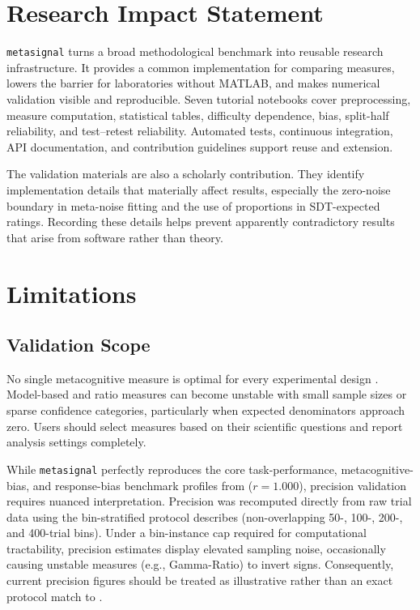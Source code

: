 \documentclass{article}
\begin{document}
\section{Research Impact Statement}\label{research-impact-statement}

\texttt{metasignal} turns a broad methodological benchmark into reusable research infrastructure. It provides a common implementation for comparing measures, lowers the barrier for laboratories without MATLAB, and makes numerical validation visible and reproducible. Seven tutorial notebooks cover preprocessing, measure computation, statistical tables, difficulty dependence, bias, split-half reliability, and test--retest reliability. Automated tests, continuous integration, API documentation, and contribution guidelines support reuse and extension.

The validation materials are also a scholarly contribution. They identify implementation details that materially affect results, especially the zero-noise boundary in meta-noise fitting and the use of proportions in SDT-expected ratings. Recording these details helps prevent apparently contradictory results that arise from software rather than theory.

\section{Limitations}\label{limitations}

\subsection{Validation Scope}\label{validation-scope}

No single metacognitive measure is optimal for every experimental design \citep{rahnev2025}. Model-based and ratio measures can become unstable with small sample sizes or sparse confidence categories, particularly when expected denominators approach zero. Users should select measures based on their scientific questions and report analysis settings completely.

While \texttt{metasignal} perfectly reproduces the core task-performance, metacognitive-bias, and response-bias benchmark profiles from \citet{rahnev2025} ($r = 1.000$), precision validation requires nuanced interpretation. Precision was recomputed directly from raw trial data using the bin-stratified protocol \citet{rahnev2025} describes (non-overlapping 50-, 100-, 200-, and 400-trial bins). Under a bin-instance cap required for computational tractability, precision estimates display elevated sampling noise, occasionally causing unstable measures (e.g., Gamma-Ratio) to invert signs. Consequently, current precision figures should be treated as illustrative rather than an exact protocol match to \citet{rahnev2025}.
\end{document}
